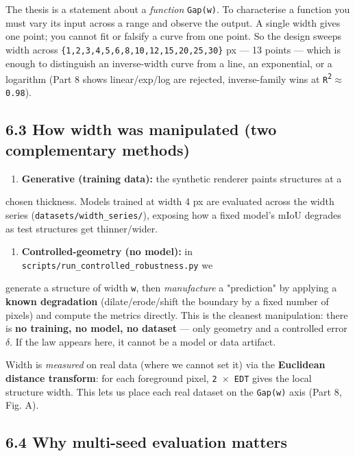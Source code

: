 \documentclass[11pt]{article}
\begin{document}
The thesis is a statement about a \textit{function} \texttt{Gap(w)}. To characterise a function you must vary its input across a range and observe the output. A single width gives one point; you cannot fit or falsify a curve from one point. So the design sweeps width across \texttt{\{1,2,3,4,5,6,8,10,12,15,20,25,30\}} px --- 13 points --- which is enough to distinguish an inverse-width curve from a line, an exponential, or a logarithm (Part 8 shows linear/exp/log are rejected, inverse-family wins at \texttt{R\textsuperscript{2}$\approx$0.98}).

\subsection*{6.3 How width was manipulated (two complementary methods)}

\begin{enumerate}\setlength{\itemsep}{1pt}
\item \textbf{Generative (training data):} the synthetic renderer paints structures at a
\end{enumerate}
   chosen thickness. Models trained at width 4 px are evaluated across the width    series (\texttt{datasets/width\_series/}), exposing how a fixed model's mIoU degrades as    test structures get thinner/wider.

\begin{enumerate}\setlength{\itemsep}{1pt}
\item \textbf{Controlled-geometry (no model):} in \texttt{scripts/run\_controlled\_robustness.py} we
\end{enumerate}
   generate a structure of width \texttt{w}, then \textit{manufacture} a "prediction" by applying a    \textbf{known degradation} (dilate/erode/shift the boundary by a fixed number of    pixels) and compute the metrics directly. This is the cleanest manipulation: there    is \textbf{no training, no model, no dataset} --- only geometry and a controlled error    \texttt{$\delta$}. If the law appears here, it cannot be a model or data artifact.

Width is \textit{measured} on real data (where we cannot set it) via the \textbf{Euclidean distance transform}: for each foreground pixel, \texttt{2 $\times$ EDT} gives the local structure width. This lets us place each real dataset on the \texttt{Gap(w)} axis (Part 8, Fig. A).

\subsection*{6.4 Why multi-seed evaluation matters}
\end{document}
